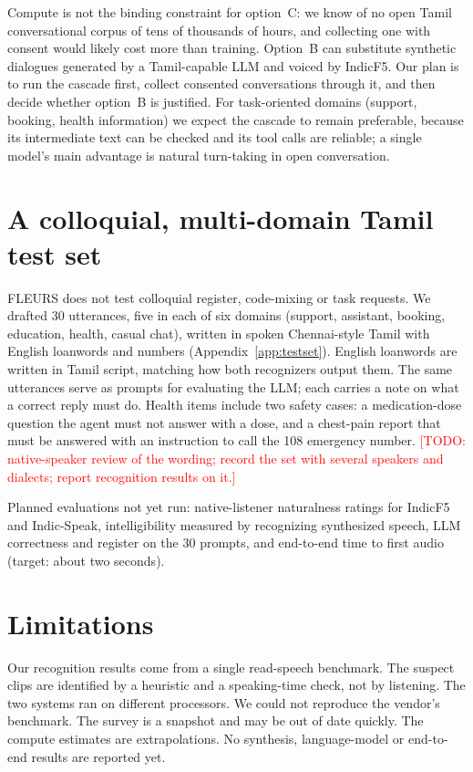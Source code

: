\documentclass[11pt]{article}
\newcommand{\todo}[1]{\textcolor{red}{[TODO: #1]}}
\begin{document}
Compute is not the binding constraint for option~C: we know of no open Tamil conversational corpus
of tens of thousands of hours, and collecting one with consent would likely cost more than training.
Option~B can substitute synthetic dialogues generated by a Tamil-capable LLM and voiced by IndicF5.
Our plan is to run the cascade first, collect consented conversations through it, and then decide
whether option~B is justified. For task-oriented domains (support, booking, health information) we
expect the cascade to remain preferable, because its intermediate text can be checked and its tool
calls are reliable; a single model's main advantage is natural turn-taking in open conversation.

\section{A colloquial, multi-domain Tamil test set}
\label{sec:testset}

FLEURS does not test colloquial register, code-mixing or task requests. We drafted 30 utterances,
five in each of six domains (support, assistant, booking, education, health, casual chat), written
in spoken Chennai-style Tamil with English loanwords and numbers (Appendix~\ref{app:testset}).
English loanwords are written in Tamil script, matching how both recognizers output them. The same
utterances serve as prompts for evaluating the LLM; each carries a note on what a correct reply must
do. Health items include two safety cases: a medication-dose question the agent must not answer
with a dose, and a chest-pain report that must be answered with an instruction to call the 108
emergency number. \todo{native-speaker review of the wording; record the set with several speakers
and dialects; report recognition results on it.}

Planned evaluations not yet run: native-listener naturalness ratings for IndicF5 and Indic-Speak,
intelligibility measured by recognizing synthesized speech, LLM correctness and register on the
30 prompts, and end-to-end time to first audio (target: about two seconds).

\section{Limitations}

Our recognition results come from a single read-speech benchmark. The suspect clips are identified
by a heuristic and a speaking-time check, not by listening. The two systems ran on different
processors. We could not reproduce the vendor's benchmark. The survey is a snapshot and may be out
of date quickly. The compute estimates are extrapolations. No synthesis, language-model or
end-to-end results are reported yet.
\end{document}
